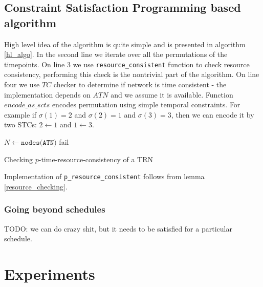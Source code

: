 \documentclass{article}
\begin{document}
\begin{multicols}{2}
\subsection{Constraint Satisfaction Programming based algorithm}
High level idea of the algorithm is quite simple and is presented in algorithm \ref{hl_algo}. In the second line we iterate over all the permutations of the timepoints. On line 3 we use \texttt{resource\_consistent} function to check resource consistency, performing this check is the nontrivial part of the algorithm. On line four we use $TC$ checker to determine if network is time consistent - the implementation depends on $ATN$ and we assume it is available. Function $encode\_as\_scts$ encodes permutation using simple temporal constraints. For example if $\sigma(1) = 2$ and $\sigma(2) = 1$ and $\sigma(3) = 3$, then we can encode it by two STCs: $ 2 \leftarrow 1 $ and $1 \leftarrow 3$.

\begin{algorithm}[H]
    \label{hl_algo}
    $N \leftarrow \texttt{nodes(ATN)}$\;
    fail\;
    \caption{Checking $p$-time-resource-consistency of a TRN }
\end{algorithm}
Implementation of \texttt{p\_resource\_consistent} follows from lemma \ref{resource_checking}.

\subsubsection{Going beyond schedules}
TODO: we can do crazy shit, but it needs to be satisfied for a particular schedule. 





\section{Experiments}

\end{multicols}
\end{document}
